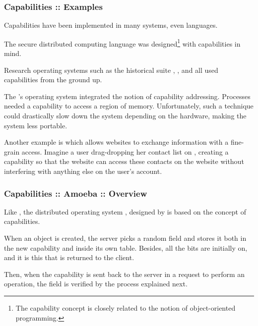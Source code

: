 
\begin{frame}
  \frametitle{Capabilities :: Examples}

  Capabilities have been implemented in many systems, even languages.

  \-

  The secure distributed computing language  was
  designed\footnote{The capability concept is closely related to the notion
  of object-oriented programming.} with capabilities in mind.

  \-

  Research operating systems such as the historical suite ,
  ,  and  all used capabilities from
  the ground up.

  \-

  The 's operating system  integrated the notion
  of capability addressing. Processes needed a capability to access a region
  of memory. Unfortunately, such a technique could drastically slow down the
  system depending on the hardware, making the system less portable.

  \-

  Another example is   which allows websites to
  exchange information with a fine-grain access. Imagine a user drag-dropping
  her  contact list on , creating a capability
  so that the  website can access these contacts on the
   website without interfering with anything else on the user's
   account.
\end{frame}


\begin{frame}
  \frametitle{Capabilities :: Amoeba :: Overview}

  Like , the distributed operating system , designed
  by   is based on the concept of
  capabilities.

  \-

  \begin{center}
  \end{center}

  \-

  When an object is created, the server picks a random  field and
  stores it both in the new capability and inside its own table. Besides,
  all the  bits are initially on, and it is this  that is returned to the client.

  \-
  
  Then, when the capability is sent back to the server in a request to perform
  an operation, the  field is verified by the process explained
  next.
\end{frame}


